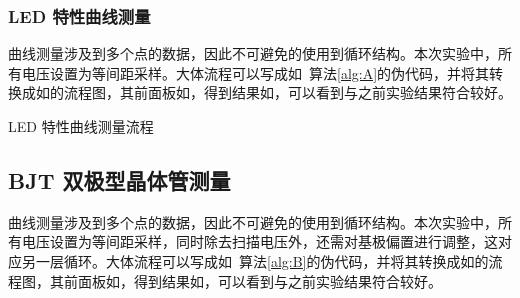 \documentclass[lang=cn,11pt,a4paper,cite=authoryear]{elegantpaper}
\begin{document}



\subsubsection{LED 特性曲线测量}

曲线测量涉及到多个点的数据，因此不可避免的使用到循环结构。本次实验中，所有电压设置为等间距采样。大体流程可以写成如~算法\ref{alg:A}的伪代码，并将其转换成如的流程图，其前面板如，得到结果如，可以看到与之前实验结果符合较好。

\begin{algorithm}
    \caption{LED 特性曲线测量流程}
    \label{alg:A}
    \begin{algorithmic}
        \REPEAT
    \end{algorithmic}
\end{algorithm}

\subsection{BJT 双极型晶体管测量}

曲线测量涉及到多个点的数据，因此不可避免的使用到循环结构。本次实验中，所有电压设置为等间距采样，同时除去扫描电压外，还需对基极偏置进行调整，这对应另一层循环。大体流程可以写成如~算法\ref{alg:B}的伪代码，并将其转换成如的流程图，其前面板如，得到结果如，可以看到与之前实验结果符合较好。



\end{document}
